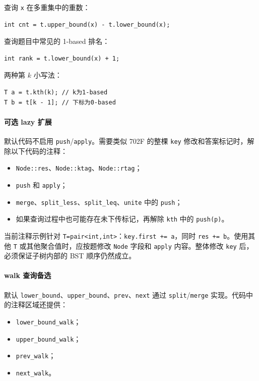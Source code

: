 查询 \texttt{x} 在多重集中的重数：

\begin{verbatim}
int cnt = t.upper_bound(x) - t.lower_bound(x);
\end{verbatim}

查询题目中常见的 1-based 排名：

\begin{verbatim}
int rank = t.lower_bound(x) + 1;
\end{verbatim}

两种第 $k$ 小写法：

\begin{verbatim}
T a = t.kth(k); // k为1-based
T b = t[k - 1]; // 下标为0-based
\end{verbatim}

\paragraph*{可选 lazy 扩展}

默认代码不启用 \texttt{push}/\texttt{apply}。需要类似 702F 的整棵 \texttt{key} 修改和答案标记时，解除以下代码的注释：

\begin{itemize}
  \item \texttt{Node::res}、\texttt{Node::ktag}、\texttt{Node::rtag}；
  \item \texttt{push} 和 \texttt{apply}；
  \item \texttt{merge}、\texttt{split\_less}、\texttt{split\_leq}、\texttt{unite} 中的 \texttt{push}；
  \item 如果查询过程中也可能存在未下传标记，再解除 \texttt{kth} 中的 \texttt{push(p)}。
\end{itemize}

当前注释示例针对 \texttt{T=pair<int,int>}：\texttt{key.first += a}，同时 \texttt{res += b}。使用其他 \texttt{T} 或其他聚合值时，应按题修改 \texttt{Node} 字段和 \texttt{apply} 内容。整体修改 \texttt{key} 后，必须保证子树内部的 BST 顺序仍然成立。

\paragraph*{walk 查询备选}

默认 \texttt{lower\_bound}、\texttt{upper\_bound}、\texttt{prev}、\texttt{next} 通过 \texttt{split}/\texttt{merge} 实现。代码中的注释区域还提供：

\begin{itemize}
  \item \texttt{lower\_bound\_walk}；
  \item \texttt{upper\_bound\_walk}；
  \item \texttt{prev\_walk}；
  \item \texttt{next\_walk}。
\end{itemize}

